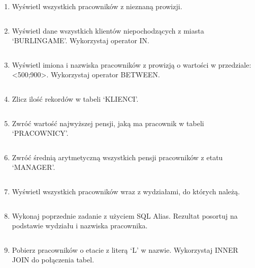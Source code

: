 \documentclass[a4paper, 10pt]{article}
\begin{document}
\begin{enumerate}
\item Wyświetl wszystkich pracowników z nieznaną prowizji.  
\begin{lstlisting}[style=SQL]
\end{lstlisting}


\item Wyświetl dane wszystkich klientów niepochodzących z miasta `BURLINGAME'. Wykorzystaj operator IN. 
\begin{lstlisting}[style=SQL]
\end{lstlisting}


\item Wyświetl imiona i nazwiska pracowników z prowizją o wartości w przedziale: <500;900>. Wykorzystaj operator BETWEEN. 
\begin{lstlisting}[style=SQL]
\end{lstlisting}


\item Zlicz ilość rekordów w tabeli `KLIENCI'. 
\begin{lstlisting}[style=SQL]
\end{lstlisting}


\item  Zwróć wartość najwyższej pensji, jaką ma pracownik w tabeli `PRACOWNICY'.  
\begin{lstlisting}[style=SQL]
\end{lstlisting}


\item Zwróć średnią arytmetyczną wszystkich pensji pracowników z etatu `MANAGER'.  
\begin{lstlisting}[style=SQL]
\end{lstlisting}


\item Wyświetl wszystkich pracowników wraz z wydziałami, do których należą.
\begin{lstlisting}[style=SQL]
\end{lstlisting}


\item Wykonaj poprzednie zadanie z użyciem SQL Alias. Rezultat posortuj na podstawie wydziału i nazwiska pracownika.  
\begin{lstlisting}[style=SQL]
\end{lstlisting}


\item Pobierz pracowników o etacie z literą `L' w nazwie. Wykorzystaj INNER JOIN do połączenia tabel. 
\begin{lstlisting}[style=SQL]
\end{lstlisting}



\end{enumerate}
\end{document}

